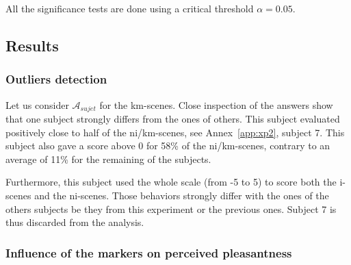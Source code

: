 \documentclass[preprint,12pt]{elsarticle}
\newcommand{\cf}{cf.}
\begin{document}

All the significance tests are done using a critical threshold $\alpha=0.05$.

\subsection{Results}

\subsubsection{Outliers detection}


Let us consider $\mathcal{A}_{sujet}$ for the km-scenes. Close inspection of the answers show that one subject strongly differs from the ones of others. This subject evaluated positively close to half of the ni/km-scenes, see Annex~\ref{app:xp2}, subject 7. This subject also gave a score above 0 for 58\% of the ni/km-scenes, contrary to an average of 11\% for the remaining of the subjects.

Furthermore, this subject used the whole scale (from -5 to 5) to score both the i-scenes and the ni-scenes. Those behaviors strongly differ with the ones of the others subjects be they from this experiment or the previous ones. Subject 7 is thus discarded from the analysis.

\subsubsection{Influence of the markers on perceived pleasantness}

\end{document}
